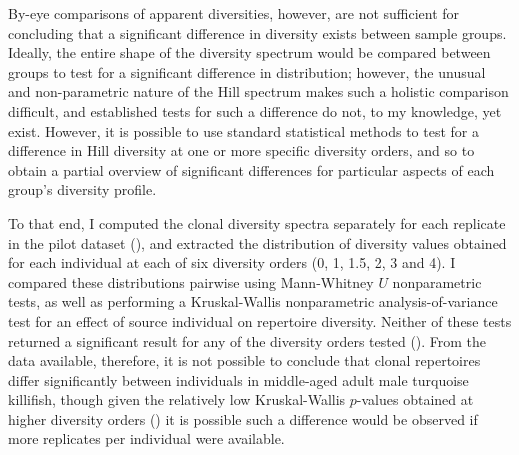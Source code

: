 By-eye comparisons of apparent diversities, however, are not sufficient for concluding that a significant difference in diversity exists between sample groups. Ideally, the entire shape of the diversity spectrum would be compared between groups to test for a significant difference in distribution; however, the unusual and non-parametric nature of the Hill spectrum makes such a holistic comparison difficult, and established tests for such a difference do not, to my knowledge, yet exist. However, it is possible to use standard statistical methods to test for a difference in Hill diversity at one or more specific diversity orders, and so to obtain a partial overview of significant differences for particular aspects of each group's diversity profile. 

To that end, I computed the clonal diversity spectra separately for each replicate in the pilot dataset (), and extracted the distribution of diversity values obtained for each individual at each of six diversity orders (0, 1, 1.5, 2, 3 and 4). I compared these distributions pairwise using Mann-Whitney $U$ nonparametric tests, as well as performing a Kruskal-Wallis nonparametric analysis-of-variance test for an effect of source individual on repertoire diversity. Neither of these tests returned a significant result for any of the diversity orders tested (). From the data available, therefore, it is not possible to conclude that clonal repertoires differ significantly between individuals in middle-aged adult male turquoise killifish, though given the relatively low Kruskal-Wallis $p$-values obtained at higher diversity orders () it is possible such a difference would be observed if more replicates per individual were available.

